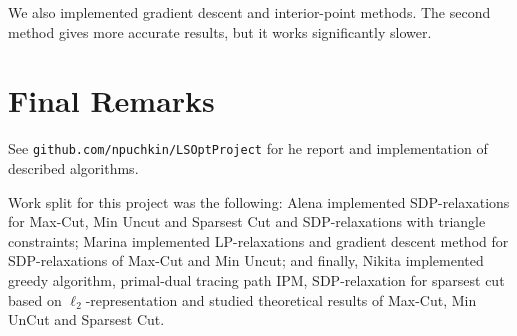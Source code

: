 \documentclass[12pt]{article}
\begin{document}
We also implemented gradient descent and interior-point methods.
The second method gives more accurate results, but it works significantly slower.

\section*{Final Remarks}

See \verb'github.com/npuchkin/LSOptProject' for he report and implementation of 
described algorithms.

Work split for this project was the following: Alena implemented SDP-relaxations for 
Max-Cut, Min Uncut and Sparsest Cut and SDP-relaxations with triangle constraints;
Marina implemented LP-relaxations and gradient descent method for SDP-relaxations of 
Max-Cut and Min Uncut;
and finally, Nikita implemented greedy algorithm, primal-dual tracing path IPM, 
SDP-relaxation for sparsest cut	based on $\ell_2$-representation and studied 
theoretical results of Max-Cut, Min UnCut and Sparsest Cut.
\end{document}
